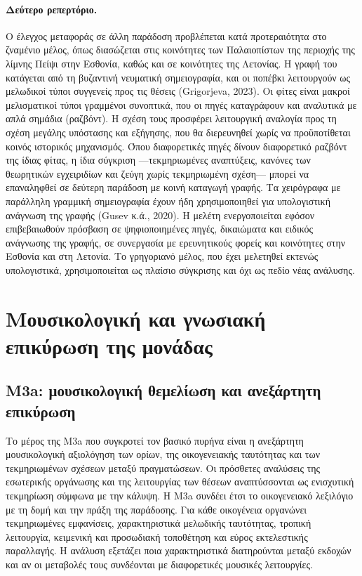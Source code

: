 \documentclass[11pt,a4paper]{article}
\begin{document}
\paragraph{Δεύτερο ρεπερτόριο.} Ο έλεγχος μεταφοράς σε άλλη παράδοση προβλέπεται κατά προτεραιότητα στο ζναμένιο μέλος, όπως διασώζεται στις κοινότητες των Παλαιοπίστων της περιοχής της λίμνης Πείψι στην Εσθονία, καθώς και σε κοινότητες της Λετονίας. Η γραφή του κατάγεται από τη βυζαντινή νευματική σημειογραφία, και οι ποπέβκι λειτουργούν ως μελωδικοί τύποι συγγενείς προς τις θέσεις (Grigorjeva, 2023). Οι φίτες είναι μακροί μελισματικοί τύποι γραμμένοι συνοπτικά, που οι πηγές καταγράφουν και αναλυτικά με απλά σημάδια (ραζβόντ). Η σχέση τους προσφέρει λειτουργική αναλογία προς τη σχέση μεγάλης υπόστασης και εξήγησης, που θα διερευνηθεί χωρίς να προϋποτίθεται κοινός ιστορικός μηχανισμός. Όπου διαφορετικές πηγές δίνουν διαφορετικό ραζβόντ της ίδιας φίτας, η ίδια σύγκριση ---τεκμηριωμένες αναπτύξεις, κανόνες των θεωρητικών εγχειριδίων και ζεύγη χωρίς τεκμηριωμένη σχέση--- μπορεί να επαναληφθεί σε δεύτερη παράδοση με κοινή καταγωγή γραφής. Τα χειρόγραφα με παράλληλη γραμμική σημειογραφία έχουν ήδη χρησιμοποιηθεί για υπολογιστική ανάγνωση της γραφής (Gusev κ.ά., 2020). Η μελέτη ενεργοποιείται εφόσον επιβεβαιωθούν πρόσβαση σε ψηφιοποιημένες πηγές, δικαιώματα και ειδικός ανάγνωσης της γραφής, σε συνεργασία με ερευνητικούς φορείς και κοινότητες στην Εσθονία και στη Λετονία. Το γρηγοριανό μέλος, που έχει μελετηθεί εκτενώς υπολογιστικά, χρησιμοποιείται ως πλαίσιο σύγκρισης και όχι ως πεδίο νέας ανάλυσης.

\section{Μουσικολογική και γνωσιακή επικύρωση της μονάδας}\label{sec:m3-human}

\subsection{M3a: μουσικολογική θεμελίωση και ανεξάρτητη επικύρωση}\label{sec:m3a}

Το μέρος της M3a που συγκροτεί τον βασικό πυρήνα είναι η ανεξάρτητη μουσικολογική αξιολόγηση των ορίων, της οικογενειακής ταυτότητας και των τεκμηριωμένων σχέσεων μεταξύ πραγματώσεων. Οι πρόσθετες αναλύσεις της εσωτερικής οργάνωσης και της λειτουργίας των θέσεων αναπτύσσονται ως ενισχυτική τεκμηρίωση σύμφωνα με την κάλυψη. Η M3a συνδέει έτσι το οικογενειακό λεξιλόγιο με τη δομή και την πράξη της παράδοσης. Για κάθε οικογένεια οργανώνει τεκμηριωμένες εμφανίσεις, χαρακτηριστικά μελωδικής ταυτότητας, τροπική λειτουργία, κειμενική και προσωδιακή τοποθέτηση και εύρος εκτελεστικής παραλλαγής. Η ανάλυση εξετάζει ποια χαρακτηριστικά διατηρούνται μεταξύ εκδοχών και αν οι μεταβολές τους συνδέονται με διαφορετικές μουσικές λειτουργίες.
\end{document}
